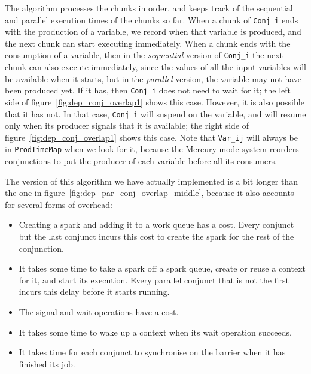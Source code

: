 The algorithm processes the chunks in order, and keeps track
of the sequential and parallel execution times of the chunks so far.
When a chunk of \verb|Conj_i| ends with the production of a variable,
we record when that variable is produced,
and the next chunk can start executing immediately.
When a chunk ends with the consumption of a variable,
then in the \emph{sequential} version of \verb|Conj_i|
the next chunk can also execute immediately,
since the values of all the input variables will be available when it starts,
but in the \emph{parallel} version,
the variable may not have been produced yet.
If it has, then \verb|Conj_i| does not need to wait for it;
the left side of figure~\ref{fig:dep_conj_overlap1} shows this case.
However, it is also possible that it has not.
In that case, \verb|Conj_i| will suspend on the variable,
and will resume only when its producer signals that it is available;
the right side of figure~\ref{fig:dep_conj_overlap1} shows this case.
Note that \verb|Var_ij|
will always be in \verb|ProdTimeMap| when we look for it,
because the Mercury mode system reorders conjunctions
to put the producer of each variable before all its consumers.

The version of this algorithm we have actually implemented is
a bit longer than the one in figure~\ref{fig:dep_par_conj_overlap_middle},
because it also accounts for several forms of overhead:

\begin{itemize}
\item
Creating a spark and adding it to a work queue has a cost.
Every conjunct but the last conjunct incurs this cost
to create the spark for the rest of the conjunction.
\item
It takes some time to take a spark off a spark queue,
create or reuse a context for it, and start its execution.
Every parallel conjunct that is not the first incurs this delay
before it starts running.
\item
The signal and wait operations have a cost.
\item
It takes some time to wake up a context when its wait operation succeeds.
\item
It takes time for each conjunct to synchronise on the barrier
when it has finished its job.
\end{itemize}

